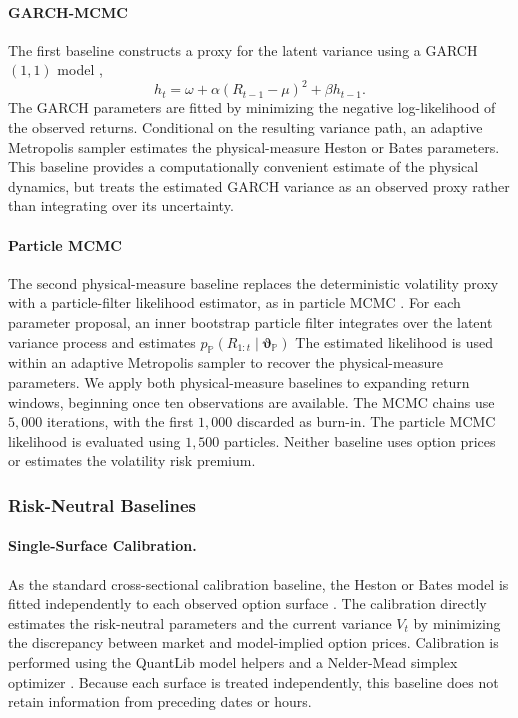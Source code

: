 \documentclass[sigconf,anonymous,review]{acmart}
\begin{document}
\paragraph{GARCH-MCMC}
The first baseline constructs a proxy for the latent variance using a GARCH\((1,1)\) model \cite{bollerslev1986garch},
%
\begin{equation}
h_t
=
\omega
+
\alpha
\left(
R_{t-1}-\mu
\right)^2
+
\beta h_{t-1}.
\end{equation}
%
The GARCH parameters are fitted by minimizing the negative log-likelihood of the observed returns. Conditional on the resulting variance path, an adaptive Metropolis sampler \cite{haario2001adaptive} estimates the physical-measure Heston or Bates parameters. This baseline provides a computationally convenient estimate of the physical dynamics, but treats the estimated GARCH variance as an observed proxy rather than integrating over its uncertainty.

\paragraph{Particle MCMC}
The second physical-measure baseline replaces the deterministic volatility proxy with a particle-filter likelihood estimator, as in particle MCMC \cite{andrieu2010particle,stramer2011bayesian}. For each parameter proposal, an inner bootstrap particle filter \cite{gordon1993bootstrap} integrates over the latent variance process and estimates $p_{\mathbb{P}}
\left(
R_{1:t}
\mid
\boldsymbol{\vartheta}_{\mathbb{P}}
\right)$
The estimated likelihood is used within an adaptive Metropolis sampler to recover the physical-measure parameters. We apply both physical-measure baselines to expanding return windows, beginning once ten observations are available. The MCMC chains use \(5{,}000\) iterations, with the first \(1{,}000\) discarded as burn-in. The particle MCMC likelihood is evaluated using \(1{,}500\) particles. Neither baseline uses option prices or estimates the volatility risk premium.

\subsubsection{Risk-Neutral Baselines}

\paragraph{Single-Surface Calibration.}
As the standard cross-sectional calibration baseline, the Heston or Bates model is fitted independently to each observed option surface \cite{cui2017full,mrazek2017calibration}. The calibration directly estimates the risk-neutral parameters and the current variance \(V_t\) by minimizing the discrepancy between market and model-implied option prices. Calibration is performed using the QuantLib model helpers \cite{quantlib} and a Nelder-Mead simplex optimizer \cite{nelder1965}. Because each surface is treated independently, this baseline does not retain information from preceding dates or hours.
\end{document}
